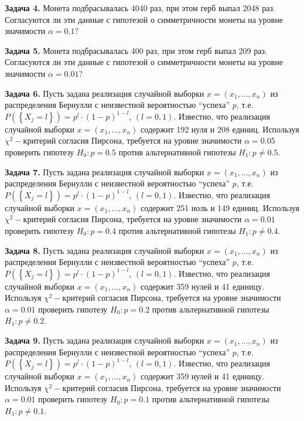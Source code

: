 \textbf{Задача 4.} Монета подбрасывалась 4040 раз, при этом герб выпал 2048 раз. Согласуются ли эти данные с гипотезой о симметричности монеты на уровне значимости $\alpha =0.1?$



\textbf{Задача 5.} Монета подбрасывалась 400 раз, при этом герб выпал 209 раз. Согласуются ли эти данные с гипотезой о симметричности монеты на уровне значимости $\alpha =0.01?$



\textbf{Задача 6.} Пусть задана реализация случайной выборки $x=\left(x_{1} ,...,x_{n} \right)$ из распределения Бернулли с неизвестной вероятностью ``успеха'' $p$, т.е. $P\left(\left\{X_{j} =l\right\}\right)=p^{l} \cdot \left(1-p\right)^{1-l} $, $\left(l=0,1\right)$. Известно, что реализация случайной выборки $x=\left(x_{1} ,...,x_{n} \right)$ содержит 192 нуля и  208 единиц. Используя $\chi ^{2} -$критерий согласия Пирсона, требуется на уровне значимости $\alpha =0.05$ проверить гипотезу $H_{0} :p=0.5$ против альтернативной гипотезы $H_{1} :p\ne 0.5$.



\textbf{Задача 7.} Пусть задана реализация случайной выборки $x=\left(x_{1} ,...,x_{n} \right)$ из распределения Бернулли с неизвестной вероятностью ``успеха'' $p$, т.е. $P\left(\left\{X_{j} =l\right\}\right)=p^{l} \cdot \left(1-p\right)^{1-l} $, $\left(l=0,1\right)$. Известно, что реализация случайной выборки $x=\left(x_{1} ,...,x_{n} \right)$ содержит 251 ноль и  149 единиц. Используя $\chi ^{2} -$критерий согласия Пирсона, требуется на уровне значимости $\alpha =0.01$ проверить гипотезу $H_{0} :p=0.4$ против альтернативной гипотезы $H_{1} :p\ne 0.4$.



\textbf{Задача 8.} Пусть задана реализация случайной выборки $x=\left(x_{1} ,...,x_{n} \right)$ из распределения Бернулли с неизвестной вероятностью ``успеха'' $p$, т.е. $P\left(\left\{X_{j} =l\right\}\right)=p^{l} \cdot \left(1-p\right)^{1-l} $, $\left(l=0,1\right)$. Известно, что реализация случайной выборки $x=\left(x_{1} ,...,x_{n} \right)$ содержит 359 нулей и  41 единицу. Используя $\chi ^{2} -$критерий согласия Пирсона, требуется на уровне значимости $\alpha =0.01$ проверить гипотезу $H_{0} :p=0.2$ против альтернативной гипотезы $H_{1} :p\ne 0.2$.



\textbf{Задача 9.} Пусть задана реализация случайной выборки $x=\left(x_{1} ,...,x_{n} \right)$ из распределения Бернулли с неизвестной вероятностью ``успеха'' $p$, т.е. $P\left(\left\{X_{j} =l\right\}\right)=p^{l} \cdot \left(1-p\right)^{1-l} $, $\left(l=0,1\right)$. Известно, что реализация случайной выборки $x=\left(x_{1} ,...,x_{n} \right)$ содержит 359 нулей и  41 единицу. Используя $\chi ^{2} -$критерий согласия Пирсона, требуется на уровне значимости $\alpha =0.01$ проверить гипотезу $H_{0} :p=0.1$ против альтернативной гипотезы $H_{1} :p\ne 0.1$.



